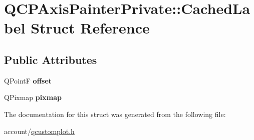 \hypertarget{structQCPAxisPainterPrivate_1_1CachedLabel}{\section{\-Q\-C\-P\-Axis\-Painter\-Private\-:\-:\-Cached\-Label \-Struct \-Reference}
\label{structQCPAxisPainterPrivate_1_1CachedLabel}
}
\subsection*{\-Public \-Attributes}
\begin{DoxyCompactItemize}
\item 
\hypertarget{structQCPAxisPainterPrivate_1_1CachedLabel_a5f502db71c92e572f1e6f44f62c59d8e}{\-Q\-Point\-F {\bfseries offset}}\label{structQCPAxisPainterPrivate_1_1CachedLabel_a5f502db71c92e572f1e6f44f62c59d8e}

\item 
\hypertarget{structQCPAxisPainterPrivate_1_1CachedLabel_a461597cbd470914a9d24b64d16037a88}{\-Q\-Pixmap {\bfseries pixmap}}\label{structQCPAxisPainterPrivate_1_1CachedLabel_a461597cbd470914a9d24b64d16037a88}

\end{DoxyCompactItemize}


\-The documentation for this struct was generated from the following file\-:\begin{DoxyCompactItemize}
\item 
account/\hyperlink{qcustomplot_8h}{qcustomplot.\-h}\end{DoxyCompactItemize}
